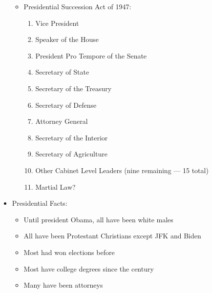 \documentclass[12pt]{article}
\begin{document}
\begin{itemize}
\begin{itemize}
      \item Presidential Succession Act of 1947:

        \begin{enumerate}

          \item Vice President

          \item Speaker of the House

          \item President Pro Tempore of the Senate

          \item Secretary of State

          \item Secretary of the Treasury

          \item Secretary of Defense

          \item Attorney General

          \item Secretary of the Interior

          \item Secretary of Agriculture

          \item Other Cabinet Level Leaders (nine remaining — 15 total)

          \item Martial Law?

        \end{enumerate}

    \end{itemize}

  \item Presidential Facts:

    \begin{itemize}

      \item Until president Obama, all have been white males

      \item All have been Protestant Christians except JFK and Biden

      \item Most had won elections before

      \item Most have college degrees since the  century

      \item Many have been attorneys


\end{itemize}
\end{itemize}
\end{document}
